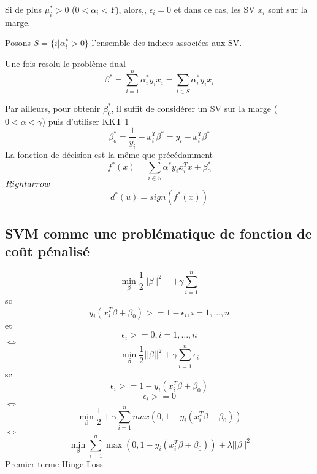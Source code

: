 \documentclass{article}
\begin{document}
 Si de plus $\mu_i^*>0$ ($0<\alpha_i<Y$), alors,, $\epsilon_i=0$ et dans ce cas, les SV $x_i$ sont sur la marge.
 
 Posons $S=\{i|\alpha_i^*>0\}$ l'ensemble des indices associ\'ees  aux SV.
 
 Une fois resolu le probl\`eme dual
\begin{equation}
\beta^*=\sum_{i=1}^n\alpha_i^*y_ix_i=\sum_{i\in S}\alpha_i^*y_ix_i
\end{equation}

Par ailleurs, pour obtenir $\beta_0^*$, il suffit de consid\'erer un SV sur la marge ($0<\alpha<\gamma$) puis d'utiliser KKT 1
\begin{equation}
\beta_o^*=\frac{1}{y_i}-x_i^T\beta^*=y_i-x_i^T\beta^*
\end{equation}
La fonction de d\'ecision est la  m\^eme que pr\'ec\'edamment
\begin{equation}
f^*(x)=\sum_{i\in S}\alpha^*y_ix_i^Tx+\beta_0^*
\end{equation}
$\\Rightarrow$
\begin{equation}
d^*(u)=sign(f^*(x))
\end{equation}
\subsection{SVM comme une probl\'ematique de fonction de co\^ut p\'enalis\'e}
\begin{equation}
\min_\beta\frac{1}{2}||\beta||^2++\gamma\sum_{i=1}^n
\end{equation}
sc
\begin{equation}
y_i(x_i^T\beta+\beta_0)>=1-\epsilon_i, i=1,\ldots,n
\end{equation}
et
\begin{equation}
\epsilon_i>=0,  i=1,\ldots,n
\end{equation}
$\Leftrightarrow$
\begin{equation}
\min_\beta \frac{1}{2}||\beta||^2+\gamma\sum_{i=1}^n\epsilon_i
\end{equation}
sc
\begin{equation}
\epsilon_i>=1-y_i(x_i^T\beta+\beta_0)
\end{equation}
\begin{equation}
\epsilon_i>=0
\end{equation}
$\Leftrightarrow$
\begin{equation}
\min_\beta\frac{1}{2}+\gamma\sum_{i=1}^nmax(0,1-y_i(x_i^T\beta+\beta_0))
\end{equation}
$\Leftrightarrow$
\begin{equation}
\min_\beta\sum_{i=1}^n\max(0,1-y_i(x_i^T\beta+\beta_0))+\lambda||\beta||^2
\end{equation}
Premier terme Hinge Loss
\end{document}
